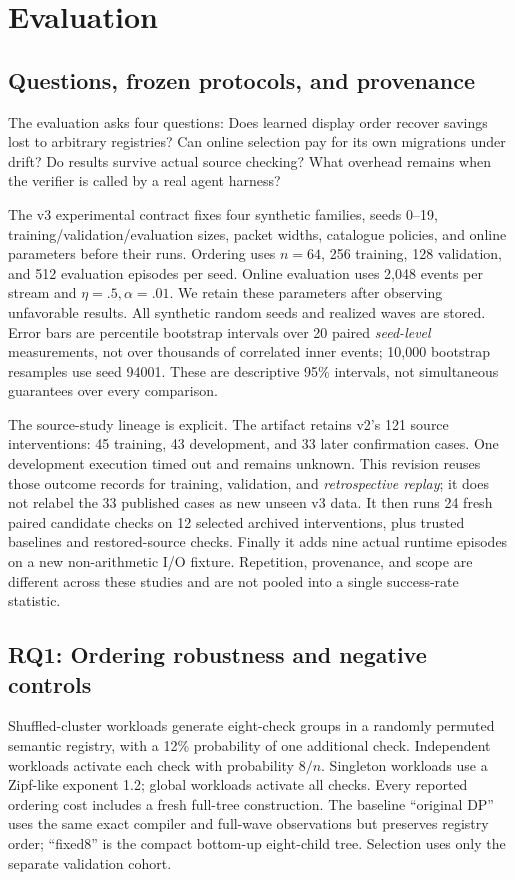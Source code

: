 \section{Evaluation}\label{sec:evaluation}
\subsection{Questions, frozen protocols, and provenance}
The evaluation asks four questions: Does learned display order recover savings lost to arbitrary registries? Can online selection pay for its own migrations under drift? Do results survive actual source checking? What overhead remains when the verifier is called by a real agent harness?

The v3 experimental contract fixes four synthetic families, seeds 0--19, training/validation/evaluation sizes, packet widths, catalogue policies, and online parameters before their runs. Ordering uses $n=64$, 256 training, 128 validation, and 512 evaluation episodes per seed. Online evaluation uses 2,048 events per stream and $\eta=.5,\alpha=.01$. We retain these parameters after observing unfavorable results. All synthetic random seeds and realized waves are stored. Error bars are percentile bootstrap intervals over 20 paired \emph{seed-level} measurements, not over thousands of correlated inner events; 10,000 bootstrap resamples use seed 94001. These are descriptive 95\% intervals, not simultaneous guarantees over every comparison.

The source-study lineage is explicit. The artifact retains v2's 121 source interventions: 45 training, 43 development, and 33 later confirmation cases. One development execution timed out and remains unknown. This revision reuses those outcome records for training, validation, and \emph{retrospective replay}; it does not relabel the 33 published cases as new unseen v3 data. It then runs 24 fresh paired candidate checks on 12 selected archived interventions, plus trusted baselines and restored-source checks. Finally it adds nine actual runtime episodes on a new non-arithmetic I/O fixture. Repetition, provenance, and scope are different across these studies and are not pooled into a single success-rate statistic.

\subsection{RQ1: Ordering robustness and negative controls}
Shuffled-cluster workloads generate eight-check groups in a randomly permuted semantic registry, with a 12\% probability of one additional check. Independent workloads activate each check with probability $8/n$. Singleton workloads use a Zipf-like exponent 1.2; global workloads activate all checks. Every reported ordering cost includes a fresh full-tree construction. The baseline ``original DP'' uses the same exact compiler and full-wave observations but preserves registry order; ``fixed8'' is the compact bottom-up eight-child tree. Selection uses only the separate validation cohort.

